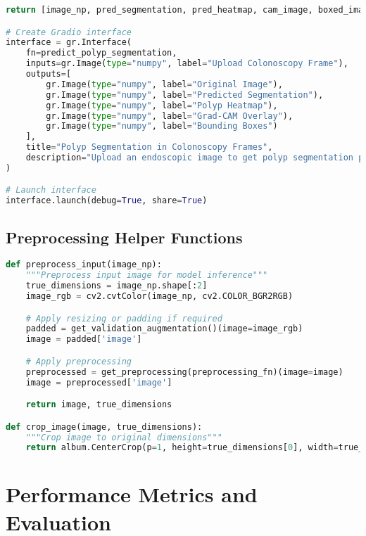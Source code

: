 \documentclass[12pt,a4paper]{report}
\begin{document}
\begin{lstlisting}[language=Python, caption=Gradio Interface]
    return [image_np, pred_segmentation, pred_heatmap, cam_image, boxed_image]

# Create Gradio interface
interface = gr.Interface(
    fn=predict_polyp_segmentation,
    inputs=gr.Image(type="numpy", label="Upload Colonoscopy Frame"),
    outputs=[
        gr.Image(type="numpy", label="Original Image"),
        gr.Image(type="numpy", label="Predicted Segmentation"),
        gr.Image(type="numpy", label="Polyp Heatmap"),
        gr.Image(type="numpy", label="Grad-CAM Overlay"),
        gr.Image(type="numpy", label="Bounding Boxes")
    ],
    title="Polyp Segmentation in Colonoscopy Frames",
    description="Upload an endoscopic image to get polyp segmentation prediction using DeepLabV3+."
)

# Launch interface
interface.launch(debug=True, share=True)
\end{lstlisting}

\section{Preprocessing Helper Functions}
\begin{lstlisting}[language=Python, caption=Preprocessing Functions]
def preprocess_input(image_np):
    """Preprocess input image for model inference"""
    true_dimensions = image_np.shape[:2]
    image_rgb = cv2.cvtColor(image_np, cv2.COLOR_BGR2RGB)

    # Apply resizing or padding if required
    padded = get_validation_augmentation()(image=image_rgb)
    image = padded['image']

    # Apply preprocessing
    preprocessed = get_preprocessing(preprocessing_fn)(image=image)
    image = preprocessed['image']

    return image, true_dimensions

def crop_image(image, true_dimensions):
    """Crop image to original dimensions"""
    return album.CenterCrop(p=1, height=true_dimensions[0], width=true_dimensions[1])(image=image)
\end{lstlisting}

\chapter{Performance Metrics and Evaluation}
\end{document}
